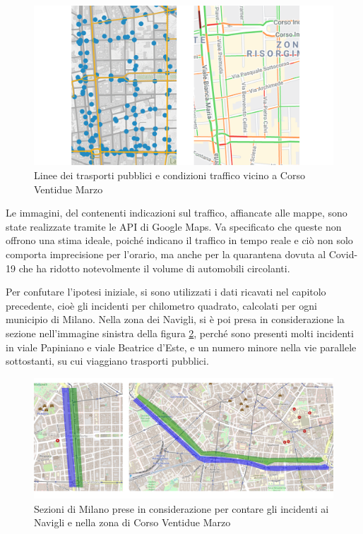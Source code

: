 \documentclass[a4paper,12pt]{report}
\begin{document}
\begin{figure}
    \includegraphics[width=\linewidth]{../src/atm/22_marzo.png}
    \caption{Linee dei trasporti pubblici e condizioni traffico vicino a Corso Ventidue Marzo}
    \label{fig:22-marzo}
\end{figure}

Le immagini, 
del contenenti indicazioni sul traffico, affiancate alle mappe, 
sono state realizzate tramite le API di 
Google Maps. 
Va specificato che queste non offrono una stima ideale, poiché indicano 
il traffico in tempo reale e ciò non solo comporta imprecisione per l'orario, 
ma anche per 
la quarantena dovuta al Covid-19 che ha ridotto notevolmente il volume di automobili 
circolanti.

Per confutare l'ipotesi iniziale, si sono utilizzati i dati ricavati 
nel capitolo precedente, 
cioè gli incidenti per chilometro quadrato, calcolati per ogni municipio di Milano. 
Nella zona dei Navigli, si è poi presa in considerazione la sezione 
nell'immagine sinistra 
della figura \ref{fig:zona-navigli-22marzo}, 
perché sono presenti molti incidenti in viale Papiniano e viale Beatrice d'Este, 
e un numero minore nella vie parallele sottostanti, su cui viaggiano 
trasporti pubblici.

\begin{figure}
    \includegraphics[width=\linewidth]{img_unite/zona_navigli_22marzo.png}
    \caption{Sezioni di Milano prese in considerazione per contare gli incidenti ai Navigli e nella zona di Corso Ventidue Marzo}
    \label{fig:zona-navigli-22marzo}
\end{figure}
\end{document}
